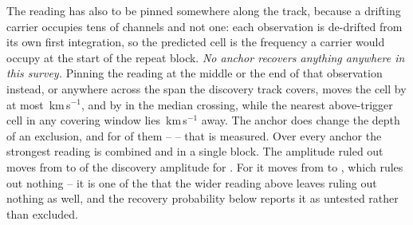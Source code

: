 The reading has also to be pinned somewhere along the track, because a
drifting carrier occupies tens of channels and not one: each observation is
de-drifted from its own first integration, so the predicted cell is the
frequency a carrier would occupy at the start of the repeat block. \emph{No anchor recovers anything anywhere in this survey.} Pinning the
reading at the middle or the end of that observation instead, or anywhere
across the span the discovery track covers, moves the cell by at most
\AnSpanMaxKms\,km\,s$^{-1}$, and by \AnSpanMedKms{} in the median crossing,
while the nearest above-trigger cell in any covering window lies
\AnNearKms\,km\,s$^{-1}$ away. The anchor does change the depth of an
exclusion, and for \AnNMeas{} of them -- \AnMeasStars{} -- that is
measured. Over every anchor the strongest
reading is \AnTBest{} combined and \AnTSingle{} in a single block. The amplitude ruled out moves from \AnOtherFrom{} to \AnOtherTo{} of the
discovery amplitude for \AnOtherStar. For \AnWorstStar{} it moves from
\AnFracFrom{} to \AnFracTo, which rules out nothing -- it is one of the
\AnNWideVac{} that the wider reading above leaves ruling out nothing as well,
and the recovery probability below reports it as untested rather than
excluded.

